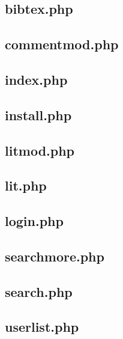 \subsection{bibtex.php}


\subsection{commentmod.php}


\subsection{index.php}


\subsection{install.php}


\subsection{litmod.php}


\subsection{lit.php}


\subsection{login.php}


\subsection{searchmore.php}


\subsection{search.php}


\subsection{userlist.php}


